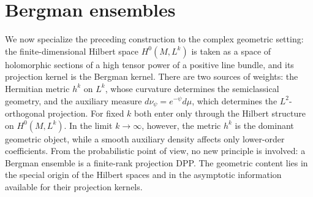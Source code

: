 \documentclass[12pt,a4paper,reqno]{article}
\theoremstyle{thmstyleone}
\theoremstyle{thmstylethree}
\theoremstyle{thmstyletwo}
\numberwithin{equation}{subsection}
\begin{document}




\section{Bergman ensembles}
\label{sec:Bergman-DPP}

We now specialize the preceding construction to the complex geometric setting: the finite-dimensional Hilbert space $H^0(M,L^k)$ is taken as a space of holomorphic sections of a high tensor power of a positive line bundle, and its projection kernel is the Bergman kernel. There are two sources of weights: the Hermitian metric $h^k$ on $L^k$, whose curvature determines the semiclassical geometry, and the auxiliary measure $d\nu_\psi=e^{-\psi}d\mu$, which determines the $L^2$-orthogonal projection. For fixed $k$ both enter only through the Hilbert structure on $H^0(M,L^k)$. In the limit $k\to\infty$, however, the metric $h^k$ is the dominant geometric object, while a smooth auxiliary density affects only lower-order coefficients. From the probabilistic point of view, no new principle is involved: a Bergman ensemble is a finite-rank projection DPP. The geometric content lies in the special origin of the Hilbert spaces and in the asymptotic information available for their projection kernels.
\end{document}

